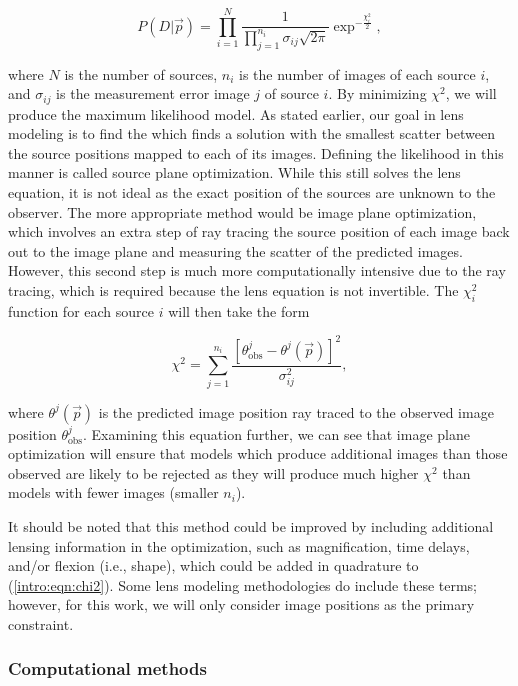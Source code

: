 \begin{equation}
P(D | \vec{p} ) = \prod_{i=1}^N \frac{1}{  \prod_{j=1}^{n_i} \sigma_{ij} \sqrt{2\pi} } \exp^{-\frac{\chi_i^2}{2}},
\label{intro:eqn:likelihood}
\end{equation}

\noindent where $N$ is the number of sources, $n_i$ is the number of images of each source $i$, and $\sigma_{ij}$ is the measurement error image $j$ of source $i$. By minimizing $\chi^2$, we will produce the maximum likelihood model. As stated earlier, our goal in lens modeling is to find the which finds a solution with the smallest scatter between the source positions mapped to each of its images. Defining the likelihood in this manner is called source plane optimization. While this still solves the lens equation, it is not ideal as the exact position of the sources are unknown to the observer. The more appropriate method would be image plane optimization, which involves an extra step of ray tracing the source position of each image back out to the image plane and measuring the scatter of the predicted images. However, this second step is much more computationally intensive due to the ray tracing, which is required because the lens equation is not invertible. The $\chi_i^2$ function for each source $i$ will then take the form

\begin{equation}
\chi^2 = \sum_{j=1}^{n_i} \frac{[\theta_\mathrm{obs}^j - \theta^j (\vec{p})]^2}{\sigma_{ij}^2},
\label{intro:eqn:chi2}
\end{equation}

\noindent where $\theta^j (\vec{p})$ is the predicted image position ray traced to the observed image position $\theta_\mathrm{obs}^j$. Examining this equation further, we can see that image plane optimization will ensure that models which produce additional images than those observed are likely to be rejected as they will produce much higher $\chi^2$ than models with fewer images (smaller $n_i$).

It should be noted that this method could be improved by including additional lensing information in the optimization, such as magnification, time delays, and/or flexion (i.e., shape), which could be added in quadrature to (\ref{intro:eqn:chi2}). Some lens modeling methodologies do include these terms; however, for this work, we will only consider image positions as the primary constraint.

\subsubsection{Computational methods}

